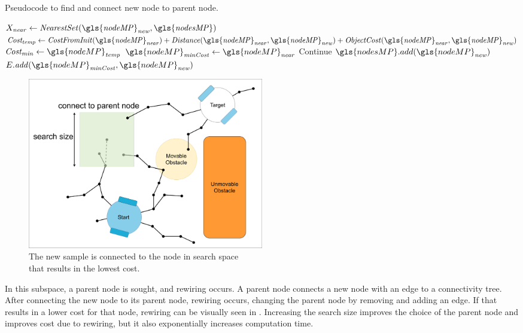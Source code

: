 \begin{algorithm}[H]
\caption{Pseudocode to find and connect new node to parent node.}%
\label{pseudocode:proposed_rrt_star_two}
\begin{algorithmic}[1]
\hspace{-0.9cm}\colorbox{my_yellow}{\parbox{\linewidth}{%
    \State $X_\mathit{near} \leftarrow \mathit{NearestSet(\gls{nodeMP}_{new}, \gls{nodesMP})}$ 
    \State $\mathit{Cost_{temp}} \leftarrow \mathit{CostFromInit(\gls{nodeMP}_{near}) + Distance(\gls{nodeMP}_{near}, \gls{nodeMP}_{new}) + ObjectCost(\gls{nodeMP}_{near}, \gls{nodeMP}_{new})}$
    \State $\mathit{Cost_{min}} \leftarrow \gls{nodeMP}_\mathit{temp}$
    \State $\gls{nodeMP}_\mathit{minCost} \leftarrow \gls{nodeMP}_\mathit{near}$
            \EndIf
        \EndIf
    \EndFor
        \State Continue
    \Else
    \State $\gls{nodesMP}.add(\gls{nodeMP}_\mathit{new})$
    \State $E.\mathit{add}(\gls{nodeMP}_\mathit{minCost}, \gls{nodeMP}_\mathit{new})$
    \EndIf
}}
\end{algorithmic}
\end{algorithm}

\begin{figure}[H]
    \centering
    \includegraphics[width=0.5\textwidth, cfbox=my_yellow 5pt 0pt]{figures/required_background/mp/4mp_connect_to_tree.drawio.png}
    \caption{The new sample is connected to the node in search space\\that results in the lowest cost.}%
    \label{fig:motion_planner_adding_one_sample_two}
\end{figure}

In this subspace, a parent node is sought, and rewiring occurs. A parent node connects a new node with an edge to a connectivity tree. After connecting the new node to its parent node, rewiring occurs, changing the parent node by removing and adding an edge. If that results in a lower cost for that node, rewiring can be visually seen in . Increasing the search size improves the choice of the parent node and improves cost due to rewiring, but it also exponentially increases computation time.

